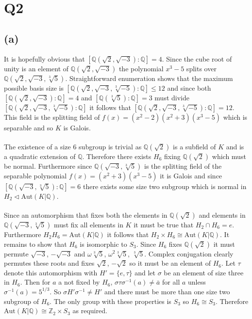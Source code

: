 \documentclass{article}
\begin{document}
\section*{Q2}
\subsection*{(a)}
It is hopefully obvious that $[\mathbb{Q}(\sqrt{2},\sqrt{-3}):\mathbb{Q}] = 4$. Since the cube 
root of unity is an element of $\mathbb{Q}(\sqrt{2},\sqrt{-3})$ the polynomial $x^3-5$ splits over 
$\mathbb{Q}(\sqrt{2},\sqrt{-3},\sqrt[3]{5})$. Straightforward enumeration shows that the maximum possible basis size 
is  
$[\mathbb{Q}(\sqrt{2},\sqrt{-3},\sqrt[3]{-5}):\mathbb{Q}]\leq 12$ and since both $[\mathbb{Q}(\sqrt{2},\sqrt{-3}):\mathbb{Q}] = 4$ 
and $[\mathbb{Q}(\sqrt[3]{5}):\mathbb{Q}] = 3$ must divide $[\mathbb{Q}(\sqrt{2},\sqrt{-3},\sqrt[3]{-5}):\mathbb{Q}]$ 
it follows that $[\mathbb{Q}(\sqrt{2},\sqrt{-3},\sqrt[3]{-5}):\mathbb{Q}] = 12$. This field 
is the splitting field of $f(x) = (x^2-2)(x^2+3)(x^3-5)$ which is separable and so $K$ is Galois.

\paragraph{}
The existence of a size 6 subgroup is trivial as $\mathbb{Q}(\sqrt{2})$ is a subfield of $K$ 
and is a quadratic extension of $\mathbb{Q}$. Therefore there exists $H_6$ fixing $\mathbb{Q}(\sqrt{2})$ 
which must be normal. Furthermore since $\mathbb{Q}(\sqrt{-3},\sqrt[3]{5})$ is the splitting field of 
the separable polynomial $f(x) = (x^2+3)(x^3-5)$ it is Galois and since $[\mathbb{Q}(\sqrt{-3},\sqrt[3]{5}):\mathbb{Q}] = 6$ 
there exists some size two subgroup which is normal in $H_2 \triangleleft \text{Aut}(K|\mathbb{Q})$.

\paragraph{}
Since an automorphism that fixes both the elements in $\mathbb{Q}(\sqrt{2})$ and elements in $\mathbb{Q}(\sqrt{-3},\sqrt[3]{5})$ 
must fix all elements in $K$ it must be true that $H_2 \cap H_6 = e$. Furthermore $H_2H_6 = \text{Aut}(K|\mathbb{Q})$ 
it follows that $H_2 \times H_6 \cong \text{Aut}(K|\mathbb{Q})$. It remains to show that $H_6$ is 
isomorphic to $S_3$. Since $H_6$ fixes $\mathbb{Q}(\sqrt{2})$ it must permute $\sqrt{-3}$, $-\sqrt{-3}$ 
and $\omega\sqrt[3]{5}$, $\omega^2\sqrt[3]{5}$, $\sqrt[3]{5}$. Complex conjugation clearly 
permutes these roots and fixes $\sqrt{2}$, $-\sqrt{2}$ so it must be an element of $H_6$. Let 
$\tau$ denote this automorphism with $H' = \{e,\tau\}$ and let $\sigma$ be an element of size three in $H_6$. Then for $a$ a not fixed by $H_6$, $\sigma\tau\sigma^{-1}(a) \neq \bar{a}$ 
for all $a$ unless $\sigma^{-1}(a) = 5^{1/3}$. So $\sigma H' \sigma^{-1} \neq H'$ and there 
must be more than one size two subgroup of $H_6$. The only group with these properties is $S_3$ so $H_6 \cong S_3$. Therefore $\text{Aut}(K|\mathbb{Q}) \cong \mathbb{Z}_2 \times S_3$ 
as required.
\end{document}

